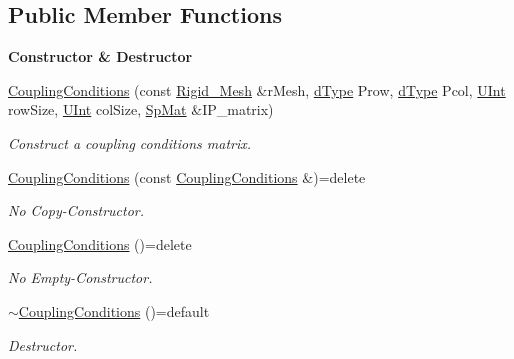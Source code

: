 \subsection*{Public Member Functions}
\begin{Indent}{\bf Constructor \& Destructor}\par
\begin{DoxyCompactItemize}
\item 
\hyperlink{classFVCode3D_1_1CouplingConditions_a03fd1f93d1449a7d7c833778507ed2a3}{Coupling\+Conditions} (const \hyperlink{classFVCode3D_1_1Rigid__Mesh}{Rigid\+\_\+\+Mesh} \&r\+Mesh, \hyperlink{classFVCode3D_1_1global__Operator_a9e94fbe56b84ba80f9e9be56c808e5c3}{d\+Type} Prow, \hyperlink{classFVCode3D_1_1global__Operator_a9e94fbe56b84ba80f9e9be56c808e5c3}{d\+Type} Pcol, \hyperlink{namespaceFVCode3D_a4bf7e328c75d0fd504050d040ebe9eda}{U\+Int} row\+Size, \hyperlink{namespaceFVCode3D_a4bf7e328c75d0fd504050d040ebe9eda}{U\+Int} col\+Size, \hyperlink{namespaceFVCode3D_ac1032289d96638cf0ad6c52ef639095f}{Sp\+Mat} \&I\+P\+\_\+matrix)
\begin{DoxyCompactList}\small\item\em Construct a coupling conditions matrix. \end{DoxyCompactList}\item 
\hyperlink{classFVCode3D_1_1CouplingConditions_aa8f7d9a15e18bad4da1b0422fc67caea}{Coupling\+Conditions} (const \hyperlink{classFVCode3D_1_1CouplingConditions}{Coupling\+Conditions} \&)=delete
\begin{DoxyCompactList}\small\item\em No Copy-\/\+Constructor. \end{DoxyCompactList}\item 
\hyperlink{classFVCode3D_1_1CouplingConditions_afeffefabac4dc4d2652102c55a9f2e66}{Coupling\+Conditions} ()=delete
\begin{DoxyCompactList}\small\item\em No Empty-\/\+Constructor. \end{DoxyCompactList}\item 
\hyperlink{classFVCode3D_1_1CouplingConditions_a6d7366d3bcaa109cf1371465bb0a20e7}{$\sim$\+Coupling\+Conditions} ()=default
\begin{DoxyCompactList}\small\item\em Destructor. \end{DoxyCompactList}\end{DoxyCompactItemize}
\end{Indent}
